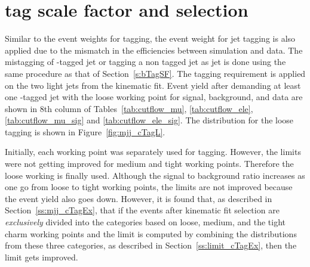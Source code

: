 \section{ tag scale factor and selection}
\label{s:cTagSF}
Similar to the event weights for \PQb tagging, the event weight for \PQc jet tagging is also 
applied due to the mismatch in the efficiencies between simulation and data. The mistagging of 
\PQc-tagged jet or tagging a non \PQc tagged jet as \PQc jet is done using the same
procedure as that of Section~\ref{s:bTagSF}. The \PQc tagging requirement is applied on the two 
light jets from the kinematic fit. Event yield after demanding at least one \PQc-tagged jet with 
the loose working point for signal, background, and data are shown in 8th column of 
Tables~\ref{tab:cutflow_mu}, \ref{tab:cutflow_ele}, \ref{tab:cutflow_mu_sig} and 
\ref{tab:cutflow_ele_sig}. The \mjj distribution for the loose \PQc tagging is shown in
Figure~\ref{fig:mjj_cTagL}.

Initially, each working point was separately used for \PQc tagging. However, the 
limits were not getting improved for medium and tight working points. Therefore the 
loose working is finally used. Although the signal to background ratio increases as 
one go from loose to tight working points, 
the limits are not improved because the event yield also goes down. However,
it is found that, as described in Section~\ref{ss:mjj_cTagEx}, that if the 
events after kinematic fit selection are \textit{exclusively} divided into the categories 
based on loose, medium, and the tight charm working points and the limit is 
computed by combining the \mjj distributions from these three categories, as described in 
Section~\ref{ss:limit_cTagEx}, then the limit gets improved.


